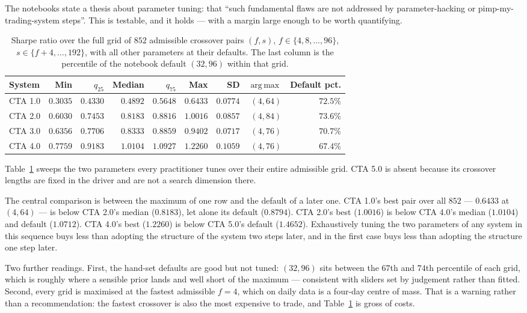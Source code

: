 \documentclass[11pt,a4paper]{article}
\DeclareMathOperator*{\argmax}{arg\,max}
\begin{document}
The notebooks state a thesis about parameter tuning: that ``such fundamental
flaws are not addressed by parameter-hacking or pimp-my-trading-system
steps''. This is testable, and it holds --- with a margin large enough to be
worth quantifying.

\begin{table}[t]
\centering
\caption{Sharpe ratio over the full grid of $852$ admissible crossover pairs
$(f, s)$, $f \in \{4, 8, \ldots, 96\}$, $s \in \{f+4, \ldots, 192\}$, with all
other parameters at their defaults. The last column is the percentile of the
notebook default $(32, 96)$ within that grid.}
\label{tab:grid}
\begin{tabular}{lrrrrrrrr}
\toprule
System & Min & $q_{25}$ & Median & $q_{75}$ & Max & SD & $\argmax$ & Default pct. \\
\midrule
CTA 1.0 & $0.3035$ & $0.4330$ & $0.4892$ & $0.5648$ & $0.6433$ & $0.0774$ & $(4, 64)$ & $72.5\%$ \\
CTA 2.0 & $0.6030$ & $0.7453$ & $0.8183$ & $0.8816$ & $1.0016$ & $0.0857$ & $(4, 84)$ & $73.6\%$ \\
CTA 3.0 & $0.6356$ & $0.7706$ & $0.8333$ & $0.8859$ & $0.9402$ & $0.0717$ & $(4, 76)$ & $70.7\%$ \\
CTA 4.0 & $0.7759$ & $0.9183$ & $1.0104$ & $1.0927$ & $1.2260$ & $0.1059$ & $(4, 76)$ & $67.4\%$ \\
\bottomrule
\end{tabular}
\end{table}

Table~\ref{tab:grid} sweeps the two parameters every practitioner tunes over
their entire admissible grid. CTA 5.0 is absent because its crossover lengths
are fixed in the driver and are not a search dimension there.

The central comparison is between the maximum of one row and the default of a
later one. CTA 1.0's best pair over all $852$ --- $0.6433$ at $(4,64)$ --- is
below CTA 2.0's median ($0.8183$), let alone its default ($0.8794$). CTA 2.0's
best ($1.0016$) is below CTA 4.0's median ($1.0104$) and default ($1.0712$).
CTA 4.0's best ($1.2260$) is below CTA 5.0's default ($1.4652$). Exhaustively
tuning the two parameters of any system in this sequence buys less than
adopting the structure of the system two steps later, and in the first case
buys less than adopting the structure one step later.

Two further readings. First, the hand-set defaults are good but not tuned:
$(32, 96)$ sits between the $67$th and $74$th percentile of each grid, which
is roughly where a sensible prior lands and well short of the maximum ---
consistent with sliders set by judgement rather than fitted. Second, every
grid is maximised at the fastest admissible $f = 4$, which on daily data is a
four-day centre of mass. That is a warning rather than a recommendation: the
fastest crossover is also the most expensive to trade, and
Table~\ref{tab:grid} is gross of costs.
\end{document}
